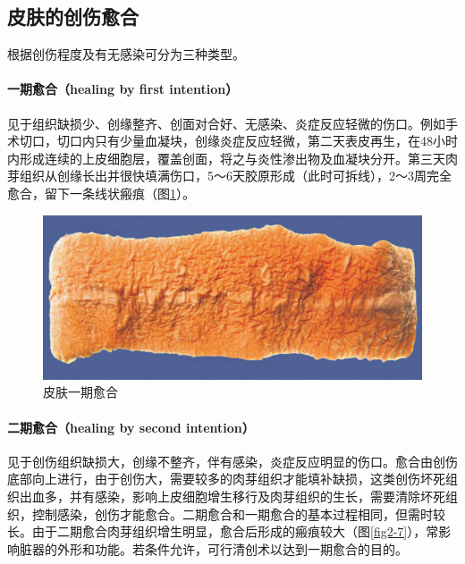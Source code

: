\subsection{皮肤的创伤愈合}

根据创伤程度及有无感染可分为三种类型。

\paragraph{一期愈合（healing by first intention）}
见于组织缺损少、创缘整齐、创面对合好、无感染、炎症反应轻微的伤口。例如手术切口，切口内只有少量血凝块，创缘炎症反应轻微，第二天表皮再生，在48小时内形成连续的上皮细胞层，覆盖创面，将之与炎性渗出物及血凝块分开。第三天肉芽组织从创缘长出并很快填满伤口，5～6天胶原形成（此时可拆线），2～3周完全愈合，留下一条线状瘢痕（图\ref{fig2-6}）。

\begin{figure}[!htbp]
	\centering
	\includegraphics{./images/Image00029.jpg}
	\caption{皮肤一期愈合}
	\label{fig2-6}
\end{figure}

\paragraph{二期愈合（healing by second intention）}
见于创伤组织缺损大，创缘不整齐，伴有感染，炎症反应明显的伤口。愈合由创伤底部向上进行，由于创伤大，需要较多的肉芽组织才能填补缺损，这类创伤坏死组织出血多，并有感染，影响上皮细胞增生移行及肉芽组织的生长，需要清除坏死组织，控制感染，创伤才能愈合。二期愈合和一期愈合的基本过程相同，但需时较长。由于二期愈合肉芽组织增生明显，愈合后形成的瘢痕较大（图\ref{fig2-7}），常影响脏器的外形和功能。若条件允许，可行清创术以达到一期愈合的目的。

